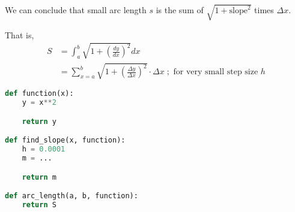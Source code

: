 \documentclass[11pt]{article}
\begin{document}
We can conclude that small arc length \(s\) is the sum of  \(\sqrt{1 + \text{slope}^2}\) times \(\Delta x\).

That is,
\[
\begin{aligned}
    S &= \int_a^b \sqrt{1 + \left( \frac{dy}{dx} \right)^2} dx \\
    &= \sum_{x=a}^b \sqrt{1 + \left( \frac{\Delta y}{ \Delta x} \right)^2} \cdot \Delta x \; ; \text{ for very small step size } h
\end{aligned}
\]

\begin{lstlisting}[language=Python]
def function(x):
    y = x**2

    return y

def find_slope(x, function):
    h = 0.0001
    m = ... 

    return m

def arc_length(a, b, function):
    return S
\end{lstlisting}
\end{document}
